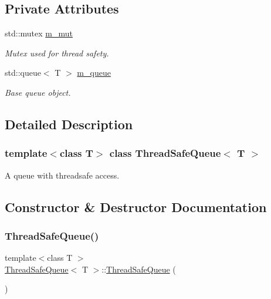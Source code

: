 \subsection*{Private Attributes}
\begin{DoxyCompactItemize}
\item 
std\+::mutex \hyperlink{class_thread_safe_queue_aed716c566c7091b8557118f29a1cf6ea}{m\+\_\+mut}
\begin{DoxyCompactList}\small\item\em Mutex used for thread safety. \end{DoxyCompactList}\item 
std\+::queue$<$ T $>$ \hyperlink{class_thread_safe_queue_a3b84a16818557f4aee11c1b810e3f953}{m\+\_\+queue}
\begin{DoxyCompactList}\small\item\em Base queue object. \end{DoxyCompactList}\end{DoxyCompactItemize}


\subsection{Detailed Description}
\subsubsection*{template$<$class T$>$\newline
class Thread\+Safe\+Queue$<$ T $>$}

A queue with threadsafe access. 

\subsection{Constructor \& Destructor Documentation}
\mbox{\label{class_thread_safe_queue_a06e14823003cc9b5d9e9151380077f08}} 
\subsubsection{\texorpdfstring{Thread\+Safe\+Queue()}{ThreadSafeQueue()}\hspace{0.1cm}{\footnotesize\ttfamily [1/3]}}
{\footnotesize\ttfamily template$<$class T $>$ \\
\hyperlink{class_thread_safe_queue}{Thread\+Safe\+Queue}$<$ T $>$\+::\hyperlink{class_thread_safe_queue}{Thread\+Safe\+Queue} (\begin{DoxyParamCaption}{ }\end{DoxyParamCaption})}



